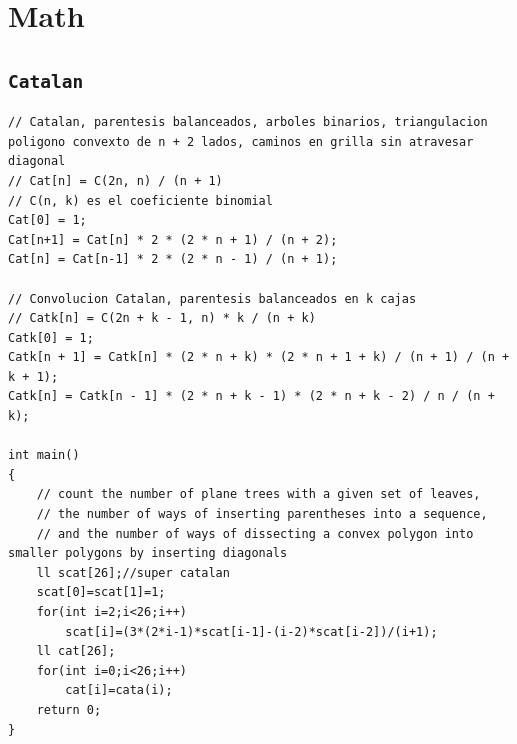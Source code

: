 \section{Math}

\subsection{\texttt{Catalan}}
\begin{lstlisting}
// Catalan, parentesis balanceados, arboles binarios, triangulacion poligono convexto de n + 2 lados, caminos en grilla sin atravesar diagonal
// Cat[n] = C(2n, n) / (n + 1)
// C(n, k) es el coeficiente binomial
Cat[0] = 1;
Cat[n+1] = Cat[n] * 2 * (2 * n + 1) / (n + 2);
Cat[n] = Cat[n-1] * 2 * (2 * n - 1) / (n + 1);

// Convolucion Catalan, parentesis balanceados en k cajas
// Catk[n] = C(2n + k - 1, n) * k / (n + k)
Catk[0] = 1;
Catk[n + 1] = Catk[n] * (2 * n + k) * (2 * n + 1 + k) / (n + 1) / (n + k + 1);
Catk[n] = Catk[n - 1] * (2 * n + k - 1) * (2 * n + k - 2) / n / (n + k);

int main()
{
	// count the number of plane trees with a given set of leaves, 
	// the number of ways of inserting parentheses into a sequence, 
	// and the number of ways of dissecting a convex polygon into smaller polygons by inserting diagonals
	ll scat[26];//super catalan
	scat[0]=scat[1]=1;
	for(int i=2;i<26;i++)
		scat[i]=(3*(2*i-1)*scat[i-1]-(i-2)*scat[i-2])/(i+1);
	ll cat[26];
	for(int i=0;i<26;i++)
		cat[i]=cata(i);
	return 0;
}
\end{lstlisting}

